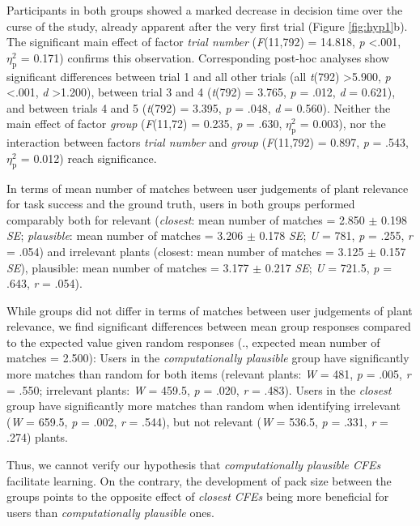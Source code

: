 Participants in both groups showed a marked decrease in decision time over the curse of the study, already apparent after the very first trial (Figure \ref{fig:hyp1}b).
The significant main effect of factor \textit{trial number} (\textit{F}(11,792) = 14.818, \textit{p} \textless .001, $\eta_{\text{p}}^{2}$ = 0.171) confirms this observation.
Corresponding post-hoc analyses show significant differences between trial 1 and all other trials (all \textit{t}(792) \textgreater 5.900, \textit{p} \textless .001, \textit{d} \textgreater 1.200), between trial 3 and 4 (\textit{t}(792) = 3.765, \textit{p} = .012, \textit{d} = 0.621), and between trials 4 and 5 (\textit{t}(792) = 3.395, \textit{p} = .048, \textit{d} = 0.560).
Neither the main effect of factor \textit{group} (\textit{F}(11,72) = 0.235, \textit{p} = .630, $\eta_{\text{p}}^{2}$ = 0.003), nor the interaction between factors \textit{trial number} and \textit{group} (\textit{F}(11,792) = 0.897, \textit{p} = .543, $\eta_{\text{p}}^{2}$ = 0.012) reach significance.

In terms of mean number of matches between user judgements of plant relevance for task success and the ground truth, users in both groups performed comparably both for relevant 
(\textit{closest}: mean number of matches = 2.850 $\pm$ 0.198 \textit{SE}; \textit{plausible}: mean number of matches = 3.206 $\pm$ 0.178 \textit{SE}; \textit{U} = 781, \textit{p} = .255, \textit{r} = .054)
and irrelevant plants (closest: mean number of matches = 3.125 $\pm$ 0.157 \textit{SE}), plausible: mean number of matches = 3.177 $\pm$ 0.217 \textit{SE}; \textit{U} = 721.5, \textit{p} = .643, \textit{r} = .054).

While groups did not differ in terms of matches between user judgements of plant relevance, we find significant differences between mean group responses compared to the expected value given random responses (\ie., expected mean number of matches = 2.500): 
Users in the \textit{computationally plausible} group have significantly more matches than random for both items (relevant plants: \textit{W} = 481, \textit{p} = .005, \textit{r} = .550; irrelevant plants: \textit{W} = 459.5, \textit{p} = .020, \textit{r} = .483).
Users in the \textit{closest} group have significantly more matches than random when identifying irrelevant (\textit{W} = 659.5, \textit{p} = .002, \textit{r} = .544), but not relevant (\textit{W} = 536.5, \textit{p} = .331, \textit{r} = .274) plants.

Thus, we cannot verify our hypothesis that \textit{computationally plausible \glspl{CFE}} facilitate learning. On the contrary, the development of pack size between the groups points to the opposite effect of \textit{closest \glspl{CFE}} being more beneficial for users than \textit{computationally plausible} ones.

